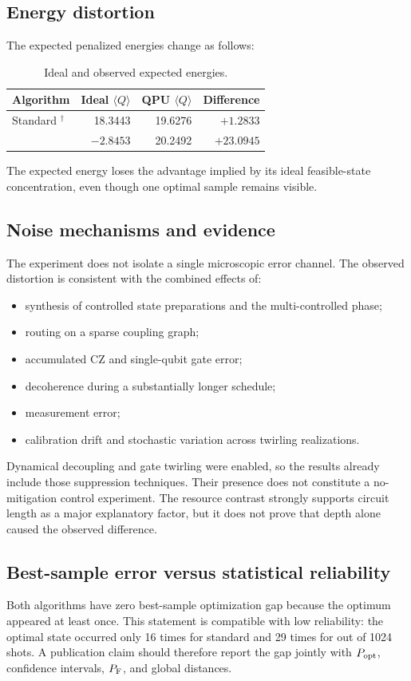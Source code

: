 \subsection{Energy distortion}

The expected penalized energies change as follows:
\begin{table}[H]
\centering
\caption{Ideal and observed expected \QUBO{} energies.}
\label{tab:energy_distortion}
\begin{tabular}{lrrr}
\toprule
Algorithm & Ideal $\langle Q\rangle$ & QPU $\langle Q\rangle$ & Difference\\
\midrule
Standard \QAOA{}$^\dagger$ & 18.3443 & 19.6276 & $+1.2833$\\
\GMQAOA{} & $-2.8453$ & 20.2492 & $+23.0945$\\
\bottomrule
\end{tabular}
\end{table}
The \GMQAOA{} expected energy loses the advantage implied by its ideal feasible-state concentration, even though one optimal sample remains visible.

\subsection{Noise mechanisms and evidence}

The experiment does not isolate a single microscopic error channel. The observed distortion is consistent with the combined effects of:
\begin{itemize}
  \item synthesis of controlled state preparations and the multi-controlled phase;
  \item routing on a sparse coupling graph;
  \item accumulated CZ and single-qubit gate error;
  \item decoherence during a substantially longer schedule;
  \item measurement error;
  \item calibration drift and stochastic variation across twirling realizations.
\end{itemize}
Dynamical decoupling and gate twirling were enabled, so the results already include those suppression techniques. Their presence does not constitute a no-mitigation control experiment. The resource contrast strongly supports circuit length as a major explanatory factor, but it does not prove that depth alone caused the observed difference.

\subsection{Best-sample error versus statistical reliability}

Both algorithms have zero best-sample optimization gap because the optimum appeared at least once. This statement is compatible with low reliability: the optimal state occurred only 16 times for standard \QAOA{} and 29 times for \GMQAOA{} out of 1024 shots. A publication claim should therefore report the gap jointly with $P_{\mathrm{opt}}$, confidence intervals, $P_{\mathrm{F}}$, and global distances.
